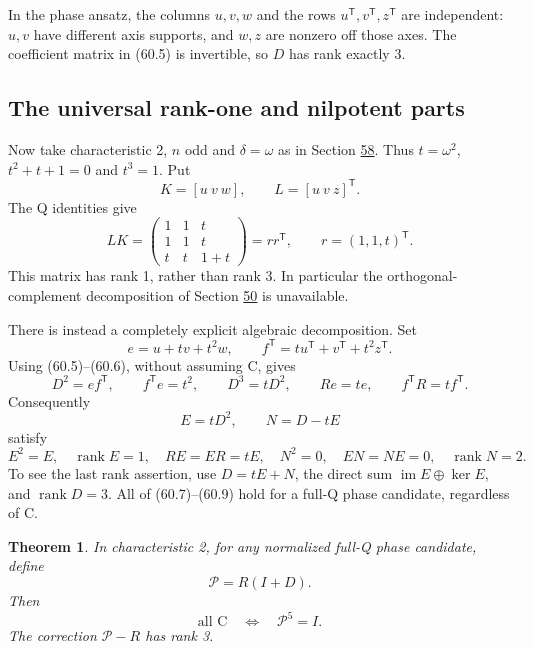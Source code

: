 \documentclass[11pt,reqno]{amsart}
\theoremstyle{plain}
\newtheorem{theorem}{Theorem}[section]
\begin{document}
In the phase ansatz, the columns \(u,v,w\) and the rows
\(u^{\mathsf T},v^{\mathsf T},z^{\mathsf T}\) are independent:
\(u,v\) have different axis supports, and \(w,z\) are nonzero
off those axes. The coefficient matrix in (60.5) is invertible, so
\(D\) has rank exactly 3.

\subsection{The universal rank-one and nilpotent parts}\label{sec:60.2}

Now take characteristic 2, \(n\) odd and \(\delta=\omega\) as in
Section \hyperref[sec:58]{58}. Thus \(t=\omega^2\), \(t^2+t+1=0\) and \(t^3=1\).
Put
\[
 K=[u\ v\ w],\qquad L=[u\ v\ z]^{\mathsf T}.
\]
The Q identities give
\begin{equation*}
 LK=\begin{pmatrix}1&1&t\\1&1&t\\t&t&1+t\end{pmatrix}
   =rr^{\mathsf T},\qquad r=(1,1,t)^{\mathsf T}.
 \tag{60.6}
\end{equation*}
This matrix has rank 1, rather than rank 3. In particular the
orthogonal-complement decomposition of Section \hyperref[sec:50]{50} is unavailable.

There is instead a completely explicit algebraic decomposition.
Set
\[
 e=u+tv+t^2w,\qquad f^{\mathsf T}=tu^{\mathsf T}
                         +v^{\mathsf T}+t^2z^{\mathsf T}.
\]
Using (60.5)--(60.6), without assuming C, gives
\begin{equation*}
 D^2=ef^{\mathsf T},\qquad f^{\mathsf T}e=t^2,
 \qquad D^3=tD^2,\qquad Re=te,\qquad f^{\mathsf T}R=tf^{\mathsf T}.
 \tag{60.7}
\end{equation*}
Consequently
\begin{equation*}
 E=tD^2,\qquad N=D-tE
 \tag{60.8}
\end{equation*}
satisfy
\begin{equation*}
 \boxed{E^2=E,\quad \operatorname{rank}E=1,\quad RE=ER=tE,
 \quad N^2=0,\quad EN=NE=0,\quad \operatorname{rank}N=2.}
 \tag{60.9}
\end{equation*}
To see the last rank assertion, use \(D=tE+N\), the direct sum
\(\operatorname{im}E\oplus\ker E\), and \(\operatorname{rank}D=3\).
All of (60.7)--(60.9) hold for a full-Q phase candidate, regardless of C.

\begin{theorem}
In characteristic 2, for any normalized full-Q phase
candidate, define
\begin{equation*}
 \boxed{\mathcal P=R(I+D).}
 \tag{60.10}
\end{equation*}
Then
\begin{equation*}
 \boxed{\text{all C}\quad\Longleftrightarrow\quad\mathcal P^5=I.}
 \tag{60.11}
\end{equation*}
The correction \(\mathcal P-R\) has rank 3.
\end{theorem}
\end{document}
